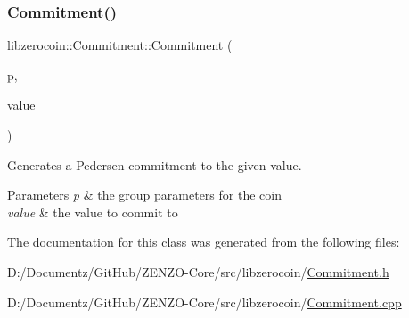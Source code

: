 \subsubsection{\texorpdfstring{Commitment()}{Commitment()}}
{\footnotesize\ttfamily libzerocoin\+::\+Commitment\+::\+Commitment (\begin{DoxyParamCaption}\item[{const \mbox{\hyperlink{classlibzerocoin_1_1_integer_group_params}{Integer\+Group\+Params}} $\ast$}]{p,  }\item[{const \mbox{\hyperlink{class_c_big_num}{C\+Big\+Num}} \&}]{value }\end{DoxyParamCaption})}

Generates a Pedersen commitment to the given value.


\begin{DoxyParams}{Parameters}
{\em p} & the group parameters for the coin \\
\hline
{\em value} & the value to commit to \\
\hline
\end{DoxyParams}


The documentation for this class was generated from the following files\+:\begin{DoxyCompactItemize}
\item 
D\+:/\+Documentz/\+Git\+Hub/\+Z\+E\+N\+Z\+O-\/\+Core/src/libzerocoin/\mbox{\hyperlink{_commitment_8h}{Commitment.\+h}}\item 
D\+:/\+Documentz/\+Git\+Hub/\+Z\+E\+N\+Z\+O-\/\+Core/src/libzerocoin/\mbox{\hyperlink{_commitment_8cpp}{Commitment.\+cpp}}\end{DoxyCompactItemize}
